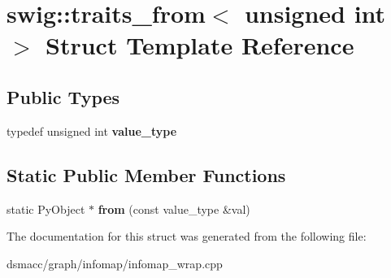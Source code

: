 \hypertarget{structswig_1_1traits__from_3_01unsigned_01int_01_4}{}\section{swig\+:\+:traits\+\_\+from$<$ unsigned int $>$ Struct Template Reference}
\label{structswig_1_1traits__from_3_01unsigned_01int_01_4}
\subsection*{Public Types}
\begin{DoxyCompactItemize}
\item 
\mbox{\label{structswig_1_1traits__from_3_01unsigned_01int_01_4_a926689dba8f153bbe2face0065a88f71}} 
typedef unsigned int {\bfseries value\+\_\+type}
\end{DoxyCompactItemize}
\subsection*{Static Public Member Functions}
\begin{DoxyCompactItemize}
\item 
\mbox{\label{structswig_1_1traits__from_3_01unsigned_01int_01_4_a023fe4a0b88aa54e07c2611e52748846}} 
static Py\+Object $\ast$ {\bfseries from} (const value\+\_\+type \&val)
\end{DoxyCompactItemize}


The documentation for this struct was generated from the following file\+:\begin{DoxyCompactItemize}
\item 
dsmacc/graph/infomap/infomap\+\_\+wrap.\+cpp\end{DoxyCompactItemize}
